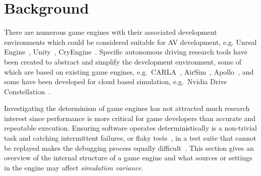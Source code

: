 \documentclass[letterpaper, 10 pt, journal, twoside]{IEEEtran}
\begin{document}
\section{Background} \label{s:background}

There are numerous game engines with their associated development environments which could be considered suitable for AV development, e.g. Unreal Engine~\cite{UE4_main_website}, Unity~\cite{Unity_main_website}, CryEngine~\cite{CryEngine_main_website}. Specific autonomous driving research tools have been created to abstract and simplify the development environment, some of which are based on existing game engines, e.g.\ CARLA~\cite{carla_main_website}, AirSim~\cite{AirSim_main_website}, Apollo~\cite{Apollo_main_website}, and some have been developed for cloud based simulation, e.g.\ Nvidia Drive Constellation~\cite{nvidia_constellation}.

Investigating the determinism of game engines has not attracted much research interest since performance is more critical for game developers than accurate and repeatable execution.  %
%
Ensuring software operates deterministically is a non-trivial task and catching intermittent failures, or flaky tests~\cite{intermittently-failing-tests}, in a test suite that cannot be replayed makes the debugging process equally difficult~\cite{acm-q-rr-interview}.
%
%
%
This section gives an overview of the internal structure of a game engine and what sources or settings in the engine may affect \textit{simulation variance}.
%
\end{document}
